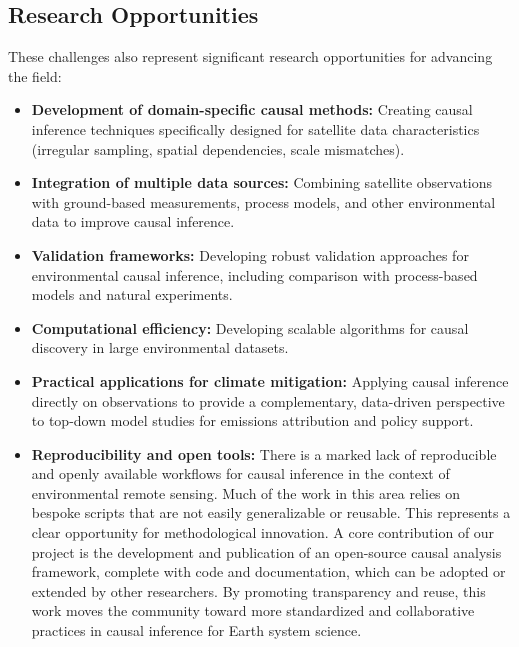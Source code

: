 \subsection{Research Opportunities}

These challenges also represent significant research opportunities for advancing the field:

\begin{itemize}
	\item \textbf{Development of domain-specific causal methods:} Creating causal inference techniques specifically designed for satellite data characteristics (irregular sampling, spatial dependencies, scale mismatches).

	\item \textbf{Integration of multiple data sources:} Combining satellite observations with ground-based measurements, process models, and other environmental data to improve causal inference.

	\item \textbf{Validation frameworks:} Developing robust validation approaches for environmental causal inference, including comparison with process-based models and natural experiments.

	\item \textbf{Computational efficiency:} Developing scalable algorithms for causal discovery in large environmental datasets.

	\item \textbf{Practical applications for climate mitigation:} Applying causal inference directly on observations to provide a complementary, data-driven perspective to top-down model studies for emissions attribution and policy support.

	\item \textbf{Reproducibility and open tools:} There is a marked lack of reproducible and openly available workflows for causal inference in the context of environmental remote sensing. Much of the work in this area relies on bespoke scripts that are not easily generalizable or reusable. This represents a clear opportunity for methodological innovation. A core contribution of our project is the development and publication of an open-source causal analysis framework, complete with code and documentation, which can be adopted or extended by other researchers. By promoting transparency and reuse, this work moves the community toward more standardized and collaborative practices in causal inference for Earth system science.
\end{itemize}

